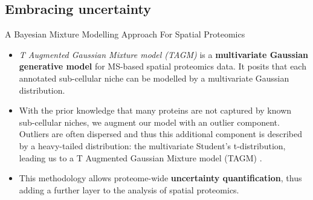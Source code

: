\subsection{Embracing uncertainty}

\begin{frame}{A Bayesian Mixture Modelling Approach For Spatial Proteomics}

  \begin{itemize}

    \item<+-> \textit{T Augmented Gaussian Mixture model (TAGM)} is a
      \textbf{multivariate Gaussian generative model} for MS-based
      spatial proteomics data. It posits that each annotated
      sub-cellular niche can be modelled by a multivariate Gaussian
      distribution.

    \item<+-> With the prior knowledge that many proteins are not
      captured by known sub-cellular niches, we augment our model with
      an outlier component. Outliers are often dispersed and thus this
      additional component is described by a heavy-tailed
      distribution: the multivariate Student's t-distribution, leading
      us to a T Augmented Gaussian Mixture model (TAGM) .

    \item<+-> This methodology allows proteome-wide
      \textbf{uncertainty quantification}, thus adding a further layer
      to the analysis of spatial proteomics.

  \end{itemize}
\end{frame}

